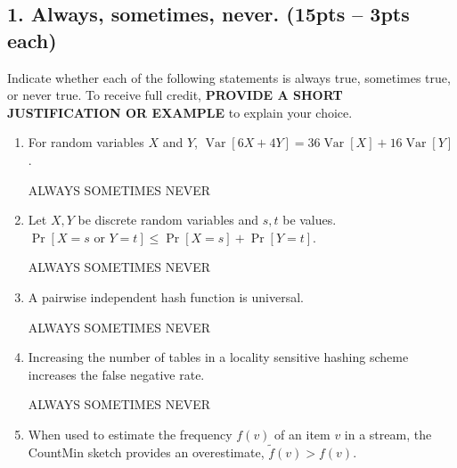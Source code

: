 \documentclass[10pt]{article}
\newcommand{\E}{\mathbb{E}}
\DeclareMathOperator{\Var}{Var}
\begin{document}
\subsection{1. Always, sometimes, never. (\textbf{\small 15pts -- 3pts each})} 
Indicate whether each of the following statements is {always} true, {sometimes} true, or {never} true. To receive full credit, \textbf{PROVIDE A SHORT JUSTIFICATION OR EXAMPLE} to explain your choice. 
\begin{enumerate}[label=(\alph*)]
	
	
	\item For random variables $X$ and $Y$, $\Var[6X + 4Y] = 36\Var[X] + 16\Var[Y]$.
	
	ALWAYS\hspace{1em} SOMETIMES\hspace{1em} NEVER\vspace{5em}
	
	\item Let $X,Y$ be discrete random variables and $s,t$ be values. $\Pr[X = s \text{ or } Y = t] \leq \Pr[X = s] + \Pr[Y = t]$.
	 
	ALWAYS\hspace{1em} SOMETIMES\hspace{1em} NEVER\vspace{5em}

	\item A pairwise independent hash function is universal. 
	
	ALWAYS\hspace{1em} SOMETIMES\hspace{1em} NEVER\vspace{5em}
	
	\item Increasing the number of tables in a locality sensitive hashing scheme increases the false negative rate.
	
	ALWAYS\hspace{1em} SOMETIMES\hspace{1em} NEVER\vspace{5em}
	
	
	\item When used to estimate the frequency $f(v)$ of an item $v$ in a stream, the CountMin sketch provides an overestimate, $\tilde{f}(v) > f(v)$.  
	

\end{enumerate}
\end{document}
